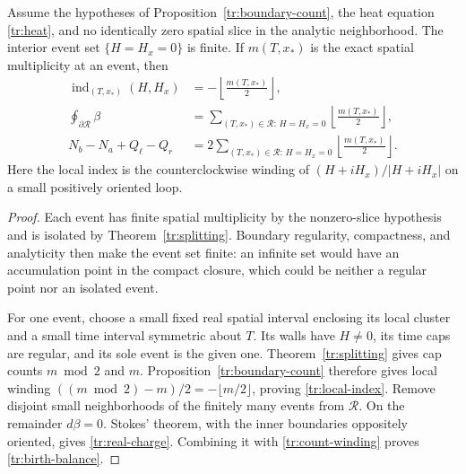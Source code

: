 \begin{theorem}\label{tr:real-balance}
Assume the hypotheses of Proposition~\ref{tr:boundary-count}, the heat
equation \eqref{tr:heat}, and no identically zero spatial slice in the
analytic neighborhood.  The interior event set $\{H=H_x=0\}$ is finite.
If $m(T,x_*)$ is the exact spatial multiplicity at an event, then
\begin{align}
 \operatorname{ind}_{(T,x_*)}(H,H_x)
       &=-\left\lfloor\frac{m(T,x_*)}{2}\right\rfloor,
                                                        \label{tr:local-index}\\
 \oint_{\partial\mathcal R}\beta
       &=\sum_{(T,x_*)\in\mathcal R:\,H=H_x=0}
                   \left\lfloor\frac{m(T,x_*)}{2}\right\rfloor,
                                                        \label{tr:real-charge}\\
 N_b-N_a+Q_\ell-Q_r
       &=2\sum_{(T,x_*)\in\mathcal R:\,H=H_x=0}
                   \left\lfloor\frac{m(T,x_*)}{2}\right\rfloor.
                                                        \label{tr:birth-balance}
\end{align}
Here the local index is the counterclockwise winding of
$(H+iH_x)/|H+iH_x|$ on a small positively oriented loop.
\end{theorem}

\begin{proof}
Each event has finite spatial multiplicity by the nonzero-slice
hypothesis and is isolated by Theorem~\ref{tr:splitting}.  Boundary
regularity, compactness, and analyticity then make the event set finite:
an infinite set would have an accumulation point in the compact closure,
which could be neither a regular point nor an isolated event.

For one event, choose a small fixed real spatial interval enclosing its
local cluster and a small time interval symmetric about $T$.  Its walls
have $H\ne0$, its time caps are regular, and its sole event is the given
one.  Theorem~\ref{tr:splitting} gives cap counts $m\bmod2$ and $m$.
Proposition~\ref{tr:boundary-count} therefore gives local winding
$((m\bmod2)-m)/2=-\lfloor m/2\rfloor$, proving
\eqref{tr:local-index}.  Remove disjoint small neighborhoods of the
finitely many events from $\mathcal R$.  On the remainder $d\beta=0$.
Stokes' theorem, with the inner boundaries oppositely oriented, gives
\eqref{tr:real-charge}.  Combining it with
\eqref{tr:count-winding} proves \eqref{tr:birth-balance}.
\end{proof}

